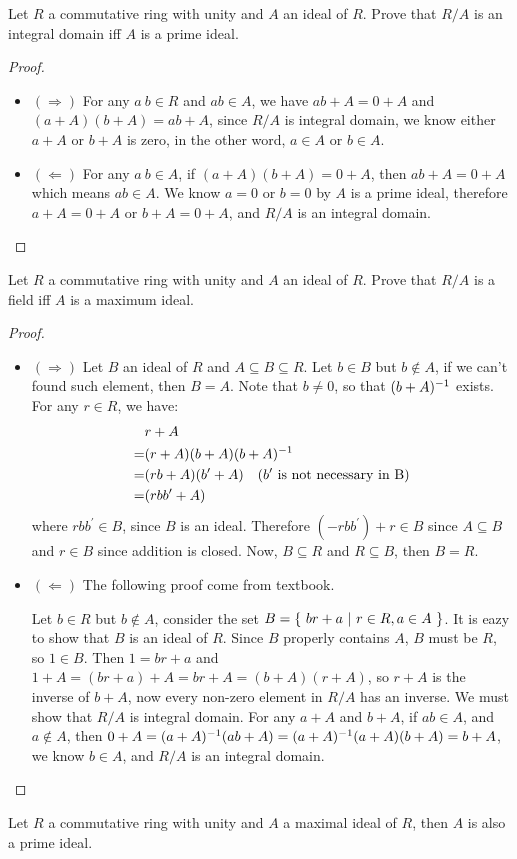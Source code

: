 \documentclass[../main.tex]{subfiles}
\begin{document}
\begin{theorem}
  Let $R$ a commutative ring with unity and $A$ an ideal of $R$. Prove that
  $R/A$ is an integral domain iff $A$ is a prime ideal.
\end{theorem}
\begin{proof}
  ~
  \begin{itemize}
    \item $(\Rightarrow)$ For any $a \ b \in R$ and $ab \in A$,
      we have $ab + A = 0 + A$ and $(a + A)(b + A) = ab + A$,
      since $R/A$ is integral domain, we know either $a + A$ or $b + A$ is
      zero, in the other word, $a \in A$ or $b \in A$.
    \item $(\Leftarrow)$ For any $a \ b \in A$, if $(a + A)(b + A) = 0 + A$,
      then $ab + A = 0 + A$ which means $ab \in A$.
      We know $a = 0$ or $b = 0$ by $A$ is a prime ideal,
      therefore $a + A = 0 + A$ or $b + A = 0 + A$, and $R/A$ is an integral domain.
  \end{itemize}
\end{proof}

\begin{theorem}
  Let $R$ a commutative ring with unity and $A$ an ideal of $R$. Prove that
  $R/A$ is a field iff $A$ is a maximum ideal.
\end{theorem}
\begin{proof}
  ~
  \begin{itemize}
    \item $(\Rightarrow)$ Let $B$ an ideal of $R$ and $A \subseteq B \subseteq R$.
      Let $b \in B$ but $b \notin A$, if we can't found such element, then $B = A$.
      Note that $b \neq 0$, so that $(b + A)^{-1}$ exists.
      For any $r \in R$, we have:
      \begin{align*}
         & r + A \\
        =& (r + A)(b + A)(b + A)^{-1} \\
        =& (rb + A)(b^\prime + A) \quad \text{($b^\prime$ is not necessary in B)} \\
        =& (rbb^\prime + A)
      \end{align*}
      where $rbb^\prime \in B$, since $B$ is an ideal.
      Therefore $(- rbb^\prime) + r \in B$ since $A \subseteq B$
      and $r \in B$ since addition is closed.
      Now, $B \subseteq R$ and $R \subseteq B$, then $B = R$.
    \item $(\Leftarrow)$ The following proof come from textbook. \par
      Let $b \in R$ but $b \notin A$, consider the set $B = \{ \ br + a \ | \ r \in R, a \in A \ \}$.
      It is eazy to show that $B$ is an ideal of $R$. Since $B$ properly contains $A$,
      $B$ must be $R$, so $1 \in B$. Then $1 = br + a$ and
      $1 + A = (br + a) + A = br + A = (b + A)(r + A)$,
      so $r + A$ is the inverse of $b + A$, now every non-zero element in $R/A$ has an inverse.
      We must show that $R/A$ is integral domain.
      For any $a + A$ and $b + A$, if $ab \in A$, and $a \notin A$,
      then $0 + A = (a + A)^{-1}(ab + A) = (a + A)^{-1}(a + A)(b + A) = b + A$,
      we know $b \in A$, and $R/A$ is an integral domain.
  \end{itemize}
\end{proof}
  
\begin{corollary}
  Let $R$ a commutative ring with unity and $A$ a maximal ideal of $R$,
  then $A$ is also a prime ideal.
\end{corollary}
\end{document}
